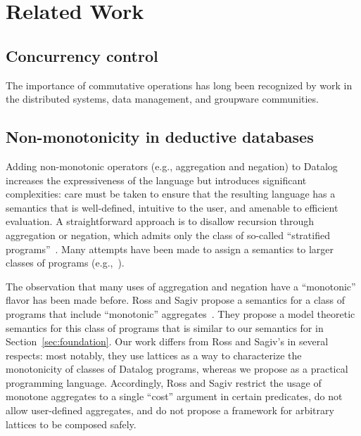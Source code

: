 \section{Related Work}

\subsection{Concurrency control}
The importance of commutative operations has long been recognized by work in the
distributed systems, data management, and groupware communities.

\subsection{Non-monotonicity in deductive databases}
Adding non-monotonic operators (e.g., aggregation and negation) to Datalog
increases the expressiveness of the language but introduces significant
complexities: care must be taken to ensure that the resulting language has a
semantics that is well-defined, intuitive to the user, and amenable to efficient
evaluation. A straightforward approach is to disallow recursion through
aggregation or negation, which admits only the class of so-called ``stratified
programs''~\cite{Apt1988}. Many attempts have been made to assign a semantics to
larger classes of programs (e.g.,~\cite{Gelfond1988,Ross1990,VanGelder1991}).

The observation that many uses of aggregation and negation have a ``monotonic''
flavor has been made before. Ross and Sagiv propose a semantics for a class of
programs that include ``monotonic'' aggregates~\cite{Ross1992}. They propose a
model theoretic semantics for this class of programs that is similar to our
semantics for \baselang in Section~\ref{sec:foundation}. Our work differs from
Ross and Sagiv's in several respects: most notably, they use lattices as a way
to characterize the monotonicity of classes of Datalog programs, whereas we
propose \lang as a practical programming language. Accordingly, Ross and Sagiv
restrict the usage of monotone aggregates to a single ``cost'' argument in
certain predicates, do not allow user-defined aggregates, and do not propose a
framework for arbitrary lattices to be composed safely.

